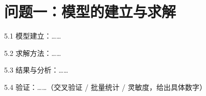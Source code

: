 \section{问题一：模型的建立与求解}

5.1 模型建立：……

5.2 求解方法：……

5.3 结果与分析：……

5.4 验证：……（交叉验证 / 批量统计 / 灵敏度，给出具体数字）
